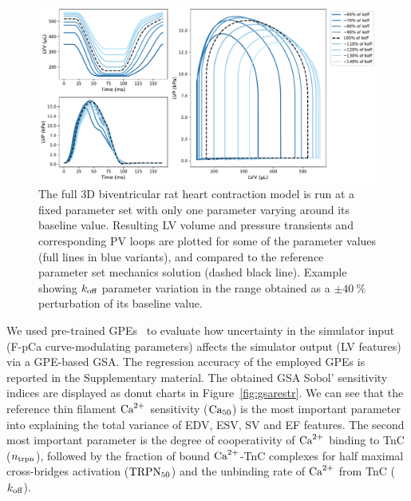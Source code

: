 \begin{figure}[h!]
    \myfloatalign
    \includegraphics[width=\textwidth]{figures/chapter08/Fig2.pdf}
    \caption{The full $3$D biventricular rat heart contraction model is run at a fixed parameter set with only one parameter varying around its baseline value. Resulting LV volume and pressure transients and corresponding PV loops are plotted for some of the parameter values (full lines in blue variants), and compared to the reference parameter set mechanics solution (dashed black line). Example showing $k_{\textrm{off}}$ parameter variation in the range obtained as a $\pm\SI{40}{\percent}$ perturbation of its baseline value.}
    \label{fig:EFvskoff}
\end{figure}

\vspace{0.2cm}
We used pre-trained GPEs~\cite{Longobardi:2020} to evaluate how uncertainty in the simulator input (F-pCa curve-modulating parameters) affects the simulator output (LV features) via a GPE-based GSA. The regression accuracy of the employed GPEs is reported in the Supplementary material. The obtained GSA Sobol' sensitivity indices are displayed as donut charts in Figure~\ref{fig:gsarestr}. We can see that the reference thin filament $\textrm{Ca}^{2+}$ sensitivity ($\textrm{Ca}_{50}$) is the most important parameter into explaining the total variance of EDV, ESV, SV and EF features. The second most important parameter is the degree of cooperativity of $\textrm{Ca}^{2+}$ binding to TnC ($n_{\textrm{trpn}}$), followed by the fraction of bound $\textrm{Ca}^{2+}$-TnC complexes for half maximal cross-bridges activation ($\textrm{TRPN}_{50}$) and the unbinding rate of $\textrm{Ca}^{2+}$ from TnC ($k_{\textrm{off}}$).

